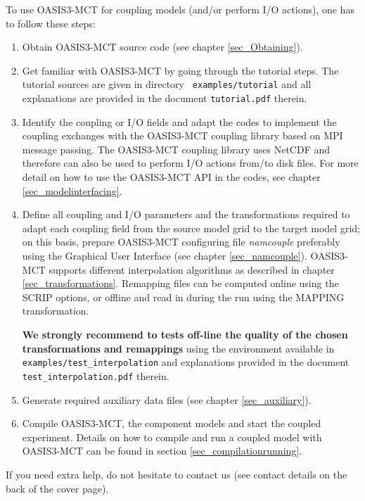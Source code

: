 To use OASIS3-MCT for coupling models (and/or perform I/O
actions), one has to follow these steps:
\begin{enumerate}
\item Obtain OASIS3-MCT source code (see chapter \ref{sec_Obtaining}).
\item Get familiar with OASIS3-MCT by going through the tutorial steps. The tutorial sources are given in directory {\tt
  examples/tutorial} and all explanations are provided in the document
{\tt tutorial.pdf} therein.

\item Identify the coupling or I/O fields and adapt the codes to
  implement the coupling exchanges with the OASIS3-MCT coupling library based on MPI message passing.
  The OASIS3-MCT coupling library uses NetCDF and therefore can also be used to perform I/O actions
  from/to disk files.  For more detail on how to use the 
  OASIS3-MCT API in the codes, see chapter \ref{sec_modelinterfacing}.

\item Define all coupling and I/O parameters and the transformations
  required to adapt each coupling field from the source model grid to
  the target model grid; on this basis, prepare OASIS3-MCT configuring file 
  {\it namcouple} preferably using the
  Graphical User Interface  (see chapter \ref{sec_namcouple}). 
  OASIS3-MCT supports different interpolation algorithms as described in
  chapter \ref{sec_transformations}.  Remapping files can be computed
  online using the SCRIP options, or offline and read in during the run using the MAPPING
  transformation.

{\bf We strongly recommend to tests off-line the quality of the chosen transformations and remappings} using the environment available in {\tt
  examples/test\_interpolation} and explanations provided in the document {\tt test\_interpolation.pdf} therein. 

\item Generate required auxiliary data files (see chapter
  \ref{sec_auxiliary}).
\item Compile OASIS3-MCT, the component models and start the coupled
  experiment. Details on how to compile and run a coupled model with OASIS3-MCT can be found in section \ref{sec_compilationrunning}. 

\end{enumerate}

If you need extra help, do not hesitate to contact us (see contact
details on the back of the cover page).

